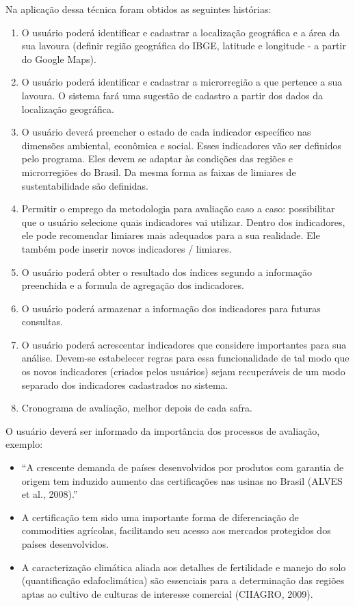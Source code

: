 Na aplicação dessa técnica foram obtidos as seguintes histórias:
\begin{enumerate}
\item O usuário poderá identificar e cadastrar a localização geográfica
e a área da sua lavoura (definir região geográfica do IBGE, latitude
e longitude - a partir do Google Maps). 
\item O usuário poderá identificar e cadastrar a microrregião a que pertence
a sua lavoura. O sistema fará uma sugestão de cadastro a partir dos
dados da localização geográfica.
\item O usuário deverá preencher o estado de cada indicador específico nas
dimensões ambiental, econômica e social. Esses indicadores vão ser
definidos pelo programa. Eles devem se adaptar às condições das regiões
e microrregiões do Brasil. Da mesma forma as faixas de limiares de
sustentabilidade são definidas.
\item Permitir o emprego da metodologia para avaliação caso a caso: possibilitar
que o usuário selecione quais indicadores vai utilizar. Dentro dos
indicadores, ele pode recomendar limiares mais adequados para a sua
realidade. Ele também pode inserir novos indicadores / limiares.
\item O usuário poderá obter o resultado dos índices segundo a informação
preenchida e a formula de agregação dos indicadores.
\item O usuário poderá armazenar a informação dos indicadores para futuras
consultas.
\item O usuário poderá acrescentar indicadores que considere importantes
para sua análise. Devem-se estabelecer regras para essa funcionalidade
de tal modo que os novos indicadores (criados pelos usuários) sejam
recuperáveis de um modo separado dos indicadores cadastrados no sistema. 
\item Cronograma de avaliação, melhor depois de cada safra. 
\end{enumerate}
O usuário deverá ser informado da importância dos processos de avaliação,
exemplo: 
\begin{itemize}
\item “A crescente demanda de países desenvolvidos por produtos com garantia
de origem tem induzido aumento das certificações nas usinas no Brasil
(ALVES et al., 2008).” 
\item A certificação tem sido uma importante forma de diferenciação de commodities
agrícolas, facilitando seu acesso aos mercados protegidos dos países
desenvolvidos. 
\item A caracterização climática aliada aos detalhes de fertilidade e manejo
do solo (quantificação edafoclimática) são essenciais para a determinação
das regiões aptas ao cultivo de culturas de interesse comercial (CIIAGRO,
2009). 
\end{itemize}

